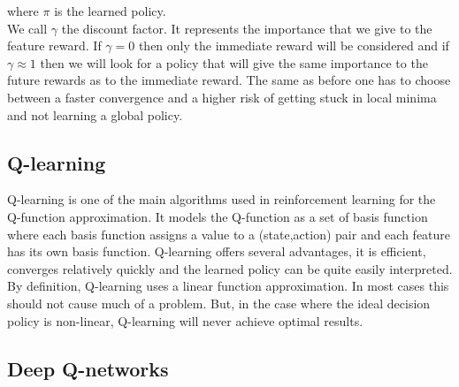 where $\pi$ is the learned policy.\\
We call $\gamma$ the discount factor. It represents the importance that we give to the feature reward. If $\gamma = 0$ then only the immediate reward will be considered and if $\gamma \approx 1$ then we will look for a policy that will give the same importance to the future rewards as to the immediate reward. The same as before one has to choose between a faster convergence and a higher risk of getting stuck in local minima and not learning a global policy.

 
\subsection{Q-learning}
Q-learning\cite{watkins1992q} is one of the main algorithms used in reinforcement learning for the Q-function approximation. It models the Q-function as a set of basis function where each basis function assigns a value to a (state,action) pair and each feature has its own basis function. Q-learning offers several advantages, it is efficient, converges relatively quickly and the learned policy can be quite easily interpreted. By definition, Q-learning uses a linear function approximation. In most cases this should not cause much of a problem. But, in the case where the ideal decision policy is non-linear, Q-learning will never achieve optimal results.
\subsection{Deep Q-networks}

